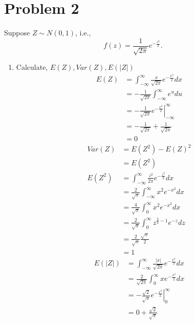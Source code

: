 \documentclass{article}
\begin{document}
    \section{Problem 2}
    Suppose $Z \sim N(0,1)$, i.e.,
    \[
        f(z) = \frac{1}{\sqrt{2 \pi }} e^{-\frac{z^2}{2}}
    .\] 
    \begin{enumerate}
        \item Calculate, $E(Z), Var(Z), E(|Z|)$
             \begin{align*}
                 E(Z) &= \int_{-\infty}^{\infty}\frac{x}{\sqrt{2\pi}}e^{-\frac{x^2}{2}}dx\\
                      &= -\frac{1}{\sqrt{2\pi}}\int_{-\infty}^{\infty}e^{u}du \\
                      &= -\frac{1}{\sqrt{2\pi}}  \left. e^{-\frac{x^2}{2}} \right|_{-\infty}^{\infty}\\
                      &= -\frac{1}{\sqrt{2\pi}} + \frac{1}{\sqrt{2\pi}} \\
                      &= 0
            \end{align*}
            \begin{align*}
                Var(Z) &= E(Z^2) - E(Z)^2 \\
                       &= E(Z^2) \\
                E(Z^2) &= \int_{-\infty}^{\infty}\frac{z^2}{2\pi}e^{-\frac{z^2}{2}}dx \\
                       &= \frac{2}{\sqrt{\pi}}\int_{-\infty}^{\infty}x^2e^{-x^2}dx \\
                       &= \frac{4}{\sqrt{\pi}}\int_{0}^{\infty}x^2e^{-x^2}dx\\
                       &= \frac{2}{\sqrt{\pi}} \int_{0}^{\infty}z^{\frac{3}{2}-1}e^{-z}dz \\
                       &= \frac{2}{\sqrt{\pi}}\frac{\sqrt{\pi}}{2} \\
                       &= 1
            \end{align*}
            \begin{align*}
                E(|Z|) &= \int_{-\infty}^{\infty}\frac{|x|}{\sqrt{2\pi}}e^{-\frac{x^2}{2}}dx \\
                       &= \frac{2}{\sqrt{2\pi}}\int_{0}^{\infty}xe^{-\frac{x^2}{2}}dx \\
                       &= -\frac{\sqrt{2}}{\sqrt{\pi}} \left. e^{-\frac{x^2}{2}} \right|_0^{\infty}\\
                       &= 0 + \frac{\sqrt{2}}{\sqrt{\pi}} \\

\end{align*}
\end{enumerate}
\end{document}
